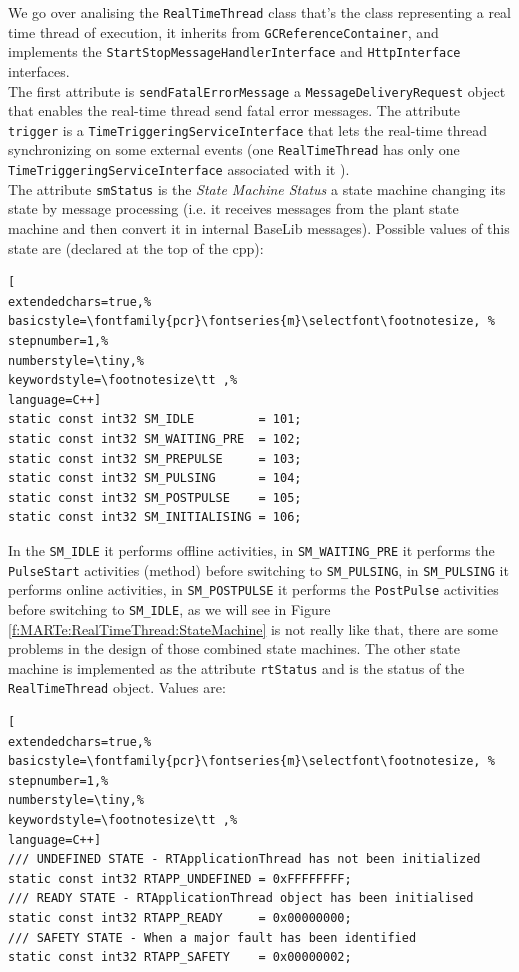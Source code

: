 We go over analising the \texttt{RealTimeThread} class that's the class representing a real time thread of execution, it inherits from \texttt{GCReferenceContainer}, and implements the \texttt{StartStopMessageHandlerInterface} and \texttt{HttpInterface} interfaces. \\


The first attribute is \texttt{sendFatalErrorMessage} a \texttt{MessageDeliveryRequest} object that enables the real-time thread send fatal error messages. The attribute \texttt{trigger} is a \texttt{TimeTriggeringServiceInterface} that lets the real-time thread synchronizing on some external events (one \texttt{RealTimeThread} has only one \texttt{TimeTriggeringServiceInterface} associated with it
). \\


The attribute \texttt{smStatus} is the \textit{State Machine Status} a state machine changing its state by message processing (i.e. it receives messages from the plant state machine and then convert it in internal BaseLib messages). Possible values of this state are (declared at the top of the cpp):
\begin{lstlisting}[
extendedchars=true,%
basicstyle=\fontfamily{pcr}\fontseries{m}\selectfont\footnotesize, %
stepnumber=1,%
numberstyle=\tiny,%
keywordstyle=\footnotesize\tt ,%
language=C++]
static const int32 SM_IDLE         = 101;
static const int32 SM_WAITING_PRE  = 102;
static const int32 SM_PREPULSE     = 103;
static const int32 SM_PULSING      = 104;
static const int32 SM_POSTPULSE    = 105;
static const int32 SM_INITIALISING = 106;
\end{lstlisting}

In the \texttt{SM\_IDLE} it performs offline activities, in \texttt{SM\_WAITING\_PRE} it performs the \texttt{PulseStart} activities (method) before switching to \texttt{SM\_PULSING}, in \texttt{SM\_PULSING} it performs online activities, in \texttt{SM\_POSTPULSE} it performs the \texttt{PostPulse} activities before switching to \texttt{SM\_IDLE}, as we will see in Figure \ref{f:MARTe:RealTimeThread:StateMachine} is not really like that, there are some problems in the design of those combined state machines. The other state machine is implemented as the attribute \texttt{rtStatus} and is the status of the \texttt{RealTimeThread} object. Values are:

\begin{lstlisting}[
extendedchars=true,%
basicstyle=\fontfamily{pcr}\fontseries{m}\selectfont\footnotesize, %
stepnumber=1,%
numberstyle=\tiny,%
keywordstyle=\footnotesize\tt ,%
language=C++]
/// UNDEFINED STATE - RTApplicationThread has not been initialized
static const int32 RTAPP_UNDEFINED = 0xFFFFFFFF;
/// READY STATE - RTApplicationThread object has been initialised
static const int32 RTAPP_READY     = 0x00000000;
/// SAFETY STATE - When a major fault has been identified
static const int32 RTAPP_SAFETY    = 0x00000002;
\end{lstlisting}

